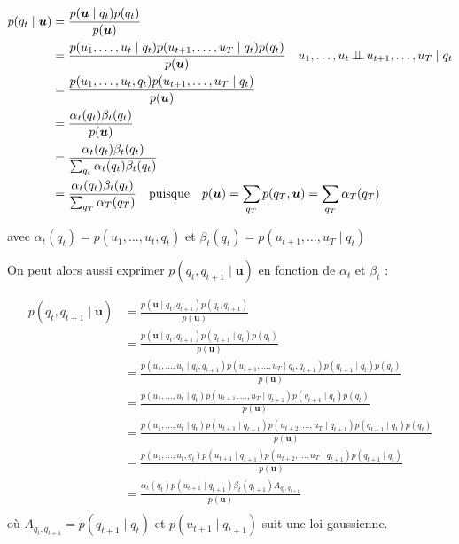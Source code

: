 \documentclass[12pt,a4paper,onecolumn]{article}
\begin{document}
\begin{equation}
	\begin{split}
		p(q_t \mid \bm{u}) &= \frac{p(\bm{u} \mid q_t)p(q_t)}{p(\bm{u})}\\
		&= \frac{p(u_1,\dots,u_t \mid q_t)p(u_{t+1},\dots,u_T \mid q_t) p(q_t)}{p(\bm{u})} \quad u_1,\dots,u_t \,\bot\!\!\!\bot\, u_{t+1},\dots,u_T \mid q_t\\
		&= \frac{p(u_1,\dots,u_t, q_t)p(u_{t+1},\dots,u_T \mid q_t)}{p(\bm{u})}\\
		&= \frac{\alpha_t(q_t)\beta_t(q_t)}{p(\bm{u})}\\
		&= \frac{\alpha_t(q_t)\beta_t(q_t)}{\sum_{q_t}\alpha_t(q_t)\beta_t(q_t)}\\
		&= \frac{\alpha_t(q_t)\beta_t(q_t)}{\sum_{q_T}\alpha_T(q_T)} \quad \text{puisque} \quad p(\bm{u}) = \sum_{q_T}p(q_T, \bm{u}) = \sum_{q_T}\alpha_T(q_T)\\
	\end{split}
	\label{filtering_eq}
\end{equation}

avec \(\alpha_t(q_t) = p(u_1,\dots,u_t, q_t)\) et \(\beta_t(q_t) = p(u_{t+1},\dots,u_T \mid q_t)\)

On peut alors aussi exprimer \(p(q_t, q_{t+1} \mid \bm{u})\) en fonction de \(\alpha_t\) et \(\beta_t\) :

\begin{equation}
	\begin{split}
		p(q_t, q_{t+1} \mid \bm{u}) &= \frac{p(\bm{u} \mid q_t, q_{t+1}) p (q_t, q_{t+1})}{p(\bm{u})}\\
		&= \frac{p(\bm{u} \mid q_t, q_{t+1}) p (q_{t+1} \mid q_t) p (q_t)}{p(\bm{u})}\\
		&= \frac{p(u_1, \dots, u_t \mid q_t, q_{t+1}) p(u_{t+1}, \dots, u_T \mid q_t, q_{t+1}) p(q_{t+1} \mid q_t) p (q_t)}{p(\bm{u})}\\
		&= \frac{p(u_1, \dots, u_t \mid q_t) p(u_{t+1}, \dots, u_T \mid q_{t+1}) p(q_{t+1} \mid q_t) p (q_t)}{p(\bm{u})}\\
		&= \frac{p(u_1, \dots, u_t \mid q_t) p(u_{t+1} \mid q_{t+1}) p(u_{t+2}, \dots, u_T \mid q_{t+1}) p(q_{t+1} \mid q_t) p (q_t)}{p(\bm{u})}\\
		&= \frac{p(u_1, \dots, u_t, q_t) p(u_{t+1} \mid q_{t+1}) p(u_{t+2}, \dots, u_T \mid q_{t+1}) p(q_{t+1} \mid q_t)}{p(\bm{u})}\\
		&= \frac{\alpha_t(q_t) p(u_{t+1} \mid q_{t+1}) \beta_t(q_{t+1}) A_{q_t, q_{t+1}}}{p(\bm{u})}\\
	\end{split}
\end{equation}
où \(A_{q_t, q_{t+1}} = p(q_{t+1} \mid q_t)\) et \(p(u_{t+1} \mid q_{t+1})\) suit une loi gaussienne.
\end{document}
